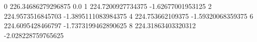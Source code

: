 0 226.34686279296875 0.0
1 224.7200927734375 -1.62677001953125
2 224.9573516845703 -1.3895111083984375
4 224.753662109375 -1.59320068359375
6 224.6095428466797 -1.7373199462890625
8 224.31863403320312 -2.028228759765625
